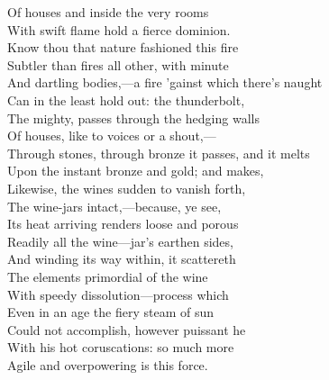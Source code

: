 Of houses and inside the very rooms\\
With swift flame hold a fierce dominion.\\
Know thou that nature fashioned this fire\\
Subtler than fires all other, with minute\\
And dartling bodies,—a fire 'gainst which there's naught\\
Can in the least hold out: the thunderbolt,\\
The mighty, passes through the hedging walls\\
Of houses, like to voices or a shout,—\\
Through stones, through bronze it passes, and it melts\\
Upon the instant bronze and gold; and makes,\\
Likewise, the wines sudden to vanish forth,\\
The wine-jars intact,—because, ye see,\\
Its heat arriving renders loose and porous\\
Readily all the wine—jar's earthen sides,\\
And winding its way within, it scattereth\\
The elements primordial of the wine\\
With speedy dissolution—process which\\
Even in an age the fiery steam of sun\\
Could not accomplish, however puissant he\\
With his hot coruscations: so much more\\
Agile and overpowering is this force.

